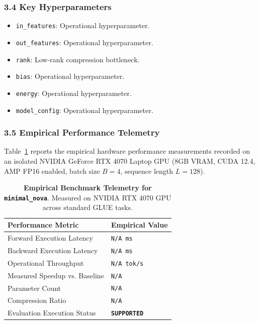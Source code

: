 \subsubsection*{3.4 Key Hyperparameters}
\begin{itemize}
    \item \texttt{in\_features}: Operational hyperparameter.
    \item \texttt{out\_features}: Operational hyperparameter.
    \item \texttt{rank}: Low-rank compression bottleneck.
    \item \texttt{bias}: Operational hyperparameter.
    \item \texttt{energy}: Operational hyperparameter.
    \item \texttt{model\_config}: Operational hyperparameter.
\end{itemize}

\subsubsection*{3.5 Empirical Performance Telemetry}
Table~\ref{tab:telemetry_minimal_nova} reports the empirical hardware performance measurements recorded on an isolated NVIDIA GeForce RTX 4070 Laptop GPU (8GB VRAM, CUDA 12.4, AMP FP16 enabled, batch size $B=4$, sequence length $L=128$).

\begin{table}[h]
\centering
\small
\caption{\textbf{Empirical Benchmark Telemetry for \texttt{minimal\_nova}}. Measured on NVIDIA RTX 4070 GPU across standard GLUE tasks.}
\label{tab:telemetry_minimal_nova}
\begin{tabularx}{\columnwidth}{lX}
\toprule
\textbf{Performance Metric} & \textbf{Empirical Value} \\
\midrule
Forward Execution Latency & \texttt{N/A ms} \\
Backward Execution Latency & \texttt{N/A ms} \\
Operational Throughput & \texttt{N/A tok/s} \\
Measured Speedup vs. Baseline & \texttt{N/A} \\
Parameter Count & \texttt{N/A} \\
Compression Ratio & \texttt{N/A} \\
Evaluation Execution Status & \textbf{\texttt{SUPPORTED}} \\
\bottomrule
\end{tabularx}
\end{table}

